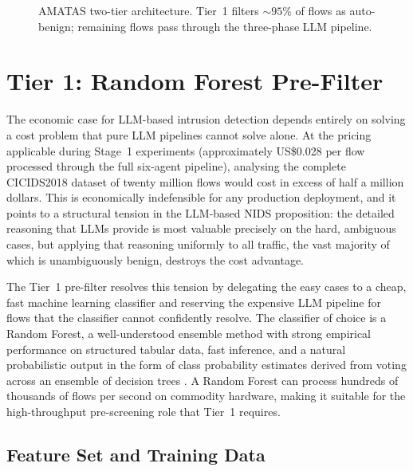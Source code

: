 \begin{figure}[H]
{%
}
\caption{AMATAS two-tier architecture. Tier~1 filters ${\sim}95\%$ of flows as auto-benign; remaining flows pass through the three-phase LLM pipeline.}
\label{fig:architecture}
\end{figure}

\section{Tier 1: Random Forest Pre-Filter}
\label{sec:tier1-rf}

The economic case for LLM-based intrusion detection depends entirely on solving a cost problem that pure LLM pipelines cannot solve alone. At the pricing applicable during Stage~1 experiments (approximately US\$0.028 per flow processed through the full six-agent pipeline), analysing the complete CICIDS2018 dataset of twenty million flows would cost in excess of half a million dollars. This is economically indefensible for any production deployment, and it points to a structural tension in the LLM-based NIDS proposition: the detailed reasoning that LLMs provide is most valuable precisely on the hard, ambiguous cases, but applying that reasoning uniformly to all traffic, the vast majority of which is unambiguously benign, destroys the cost advantage.

The Tier~1 pre-filter resolves this tension by delegating the easy cases to a cheap, fast machine learning classifier and reserving the expensive LLM pipeline for flows that the classifier cannot confidently resolve. The classifier of choice is a Random Forest, a well-understood ensemble method with strong empirical performance on structured tabular data, fast inference, and a natural probabilistic output in the form of class probability estimates derived from voting across an ensemble of decision trees \autocite{Breiman2001}. A Random Forest can process hundreds of thousands of flows per second on commodity hardware, making it suitable for the high-throughput pre-screening role that Tier~1 requires.

\subsection{Feature Set and Training Data}
\label{sec:feature-set-training}

